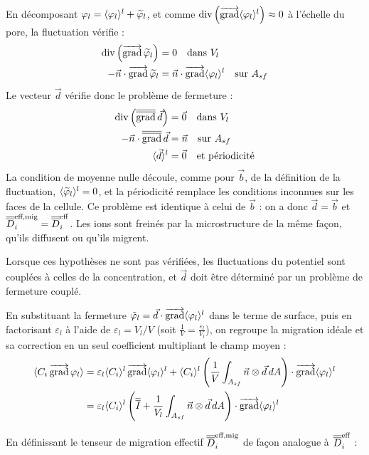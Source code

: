 En décomposant $\varphi_l = \langle \varphi_l \rangle^l + \widetilde{\varphi}_l$, et
comme $\operatorname{div}\left(\mathop{\overrightarrow{\operatorname{grad}}}\nolimits\langle \varphi_l \rangle^l\right) \approx 0$ à l'échelle du
pore, la fluctuation vérifie :
\begin{align}
\operatorname{div}\left(\mathop{\overrightarrow{\operatorname{grad}}}\nolimits\widetilde{\varphi}_l\right) &= 0 \quad \text{dans } V_l \\
-\vec{n}\cdot\mathop{\overrightarrow{\operatorname{grad}}}\nolimits\widetilde{\varphi}_l &= \vec{n}\cdot\mathop{\overrightarrow{\operatorname{grad}}}\nolimits\langle \varphi_l \rangle^l \quad \text{sur } A_{sf}
\end{align}
Le vecteur $\vec{d}$ vérifie donc le problème de fermeture :
\begin{align}
\operatorname{div}\left(\mathop{\overline{\overline{\operatorname{grad}}}}\nolimits \vec{d}\right) &= \vec{0} \quad \text{dans } V_l \\
-\vec{n}\cdot\mathop{\overline{\overline{\operatorname{grad}}}}\nolimits\vec{d} &= \vec{n} \quad \text{sur } A_{sf}\\
\langle \vec{d} \rangle^l &= \vec{0} \quad \text{et périodicité}
\end{align}
La condition de moyenne nulle découle, comme pour $\vec{b}$, de la
définition de la fluctuation, $\langle \widetilde{\varphi}_l \rangle^l = 0$, et la
périodicité remplace les conditions inconnues sur les faces de la
cellule. Ce problème est identique à celui de $\vec{b}$ : on a donc
$\vec{d} = \vec{b}$ et $\overline{\overline{D}}_i^{\text{eff,mig}} = \overline{\overline{D}}_i^{\mathrm{eff}}$.
Les ions sont freinés par la microstructure de la même façon, qu'ils
diffusent ou qu'ils migrent.

Lorsque ces hypothèses ne sont pas vérifiées, les fluctuations du
potentiel sont couplées à celles de la concentration, et $\vec{d}$ doit
être déterminé par un problème de fermeture couplé.

En substituant la fermeture $\tilde\varphi_l = \vec{d}\cdot\mathop{\overrightarrow{\operatorname{grad}}}\nolimits\langle \varphi_l \rangle^l$
dans le terme de surface, puis en factorisant $\varepsilon_l$ à l'aide de
$\varepsilon_l = V_l/V$ (soit $\tfrac{1}{V} = \tfrac{\varepsilon_l}{V_l}$), on
regroupe la migration idéale et sa correction en un seul coefficient
multipliant le champ moyen :
\begin{align}
\langle C_i \mathop{\overrightarrow{\operatorname{grad}}}\nolimits\varphi_l \rangle
&= \varepsilon_l \langle C_i \rangle^l \mathop{\overrightarrow{\operatorname{grad}}}\nolimits\langle \varphi_l \rangle^l
+ \langle C_i \rangle^l \left(\frac{1}{V}\int_{A_{sf}} \vec{n}\otimes\vec{d}\, dA\right)\cdot \mathop{\overrightarrow{\operatorname{grad}}}\nolimits\langle \varphi_l \rangle^l \notag\\
&= \varepsilon_l \langle C_i \rangle^l \left(\overline{\overline{I}} + \frac{1}{V_l}\int_{A_{sf}} \vec{n}\otimes\vec{d}\, dA \right)\cdot \mathop{\overrightarrow{\operatorname{grad}}}\nolimits\langle \varphi_l \rangle^l
\end{align}

En définissant le tenseur de migration effectif $\overline{\overline{D}}_i^{\text{eff,mig}}$
de façon analogue à $\overline{\overline{D}}_i^{\mathrm{eff}}$ :

